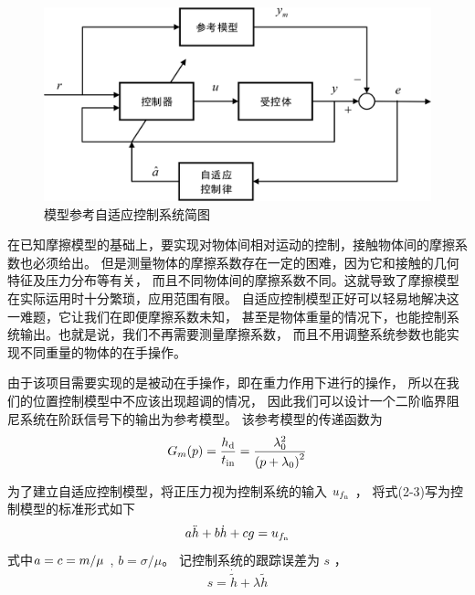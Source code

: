 \begin{figure}[!ht]
  \centering
  \includegraphics[width=12cm]{chapter02/pic/2-2}
  \caption{模型参考自适应控制系统简图}
  \label{fig:2-2}
  \vspace{-0.3cm}
\end{figure}

在已知摩擦模型的基础上，要实现对物体间相对运动的控制，接触物体间的摩擦系数也必须给出。
但是测量物体的摩擦系数存在一定的困难，因为它和接触的几何特征及压力分布等有关，
而且不同物体间的摩擦系数不同。这就导致了摩擦模型在实际运用时十分繁琐，应用范围有限。
自适应控制模型正好可以轻易地解决这一难题，它让我们在即便摩擦系数未知，
甚至是物体重量的情况下，也能控制系统输出。也就是说，我们不再需要测量摩擦系数，
而且不用调整系统参数也能实现不同重量的物体的在手操作。

由于该项目需要实现的是被动在手操作，即在重力作用下进行的操作，
所以在我们的位置控制模型中不应该出现超调的情况，
因此我们可以设计一个二阶临界阻尼系统在阶跃信号下的输出为参考模型。
该参考模型的传递函数为
\begin{equation}
  {G_m}(p) = \frac{{{h_{\rm d}}}}{{{t_{\rm in}}}} = \frac{{\lambda _{\rm 0}^{\rm 2}}}{{{{\left( {p + {\lambda _{\rm 0}}} \right)}^{\rm 2}}}}
  \label{equ:2-4}
\end{equation}

\begin{note}
\end{note}


为了建立自适应控制模型，将正压力视为控制系统的输入 $u_{f_{\rm n}}$ ，
将式(2-3)写为控制模型的标准形式如下
\begin{equation}
  a\ddot h + b\dot h + cg = {u_{{f_{\rm n}}}}
  \label{euq:2-5}
\end{equation}
式中$a = c = {m \mathord{\left/
{\vphantom {m \mu }} \right.
\kern-\nulldelimiterspace} \mu }$ , $b = \sigma /\mu $。
记控制系统的跟踪误差为 $s$ ，
\begin{equation}
  s = \dot{\tilde h}  + \lambda \tilde h
  \label{euq:2-6}
\end{equation}

